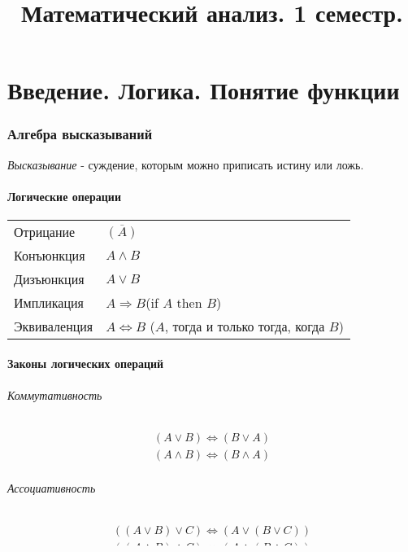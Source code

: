\documentclass[10pt]{article}
\title{Математический анализ. 1 семестр.}
\author{}
\date{}
\begin{document}
\maketitle

\part{Введение. Логика. Понятие функции}
\section{Алгебра высказываний}
	\textit{Высказывание} - суждение, которым можно приписать истину или ложь.
	\subsection{Логические операции}
		\begin{tabular}{l l}
			Отрицание & $\overline{(A)}$ \\
			Конъюнкция & $A \wedge B$ \\
			Дизъюнкция & $A \vee B$ \\
			Импликация & $A \Rightarrow B $(if $A$ then $B$) \\
			Эквиваленция & $A \Leftrightarrow B$ ($A$, тогда и только тогда, когда $B$)
		\end{tabular}
	\subsection{Законы логических операций}
		\paragraph{Коммутативность}
		\begin{eqnarray}
			(A \vee B) \Leftrightarrow (B \vee A) \\
			(A \wedge B) \Leftrightarrow (B \wedge A)
		\end{eqnarray}
		\paragraph{Ассоциативность}
		\begin{eqnarray}
			((A \vee B) \vee C) \Leftrightarrow (A \vee (B \vee C)) \\
			((A \wedge B) \wedge C) \Leftrightarrow (A \wedge (B \wedge C))
		\end{eqnarray}
		\paragraph{Дистрибутивность}
		\begin{eqnarray}
			(A \wedge (B \vee C)) \Leftrightarrow ((A \wedge B) \vee (A \wedge C)) \\
			(A \vee (B \wedge C)) \Leftrightarrow ((A \vee B) \wedge (A \vee C))
		\end{eqnarray}
\end{document}
